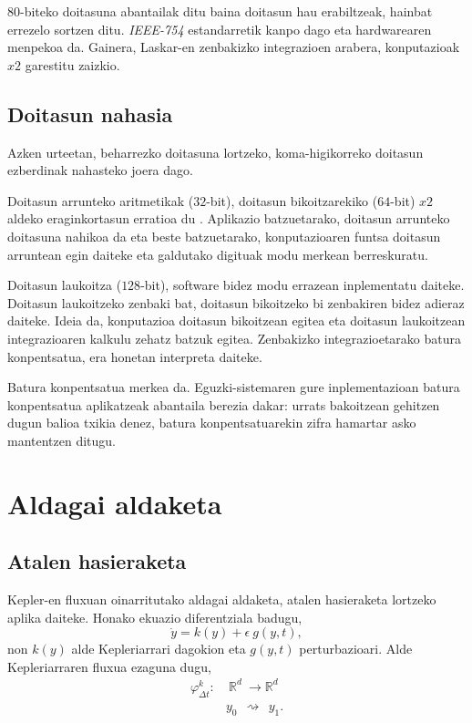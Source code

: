 $80$-biteko doitasuna abantailak ditu baina doitasun hau erabiltzeak, hainbat errezelo sortzen ditu. 
 \emph{IEEE-754} estandarretik kanpo dago eta hardwarearen menpekoa da. Gainera, Laskar-en \cite{Laskar2011} zenbakizko integrazioen arabera, konputazioak $x2$ garestitu zaizkio. 


\subsection*{Doitasun nahasia}


Azken urteetan, beharrezko doitasuna lortzeko, koma-higikorreko doitasun ezberdinak nahasteko joera dago. 

Doitasun arrunteko aritmetikak ($32$-bit), doitasun bikoitzarekiko ($64$-bit) $x2$ aldeko eraginkortasun erratioa  du \cite{Dongarra2017}. Aplikazio batzuetarako, doitasun arrunteko doitasuna nahikoa da eta beste batzuetarako, konputazioaren funtsa doitasun arruntean egin daiteke eta galdutako digituak modu merkean berreskuratu.

Doitasun laukoitza ($128$-bit), software bidez modu errazean  inplementatu daiteke. Doitasun laukoitzeko zenbaki bat, doitasun bikoitzeko bi zenbakiren bidez adieraz daiteke. Ideia da, konputazioa doitasun bikoitzean egitea eta doitasun laukoitzean integrazioaren kalkulu zehatz batzuk egitea. Zenbakizko integrazioetarako batura konpentsatua, era honetan interpreta daiteke. 

Batura konpentsatua merkea da. Eguzki-sistemaren gure inplementazioan batura konpentsatua aplikatzeak abantaila berezia dakar: urrats bakoitzean gehitzen dugun balioa txikia denez, batura konpentsatuarekin zifra hamartar asko mantentzen ditugu.            


\section{Aldagai aldaketa}


\subsection*{Atalen hasieraketa}
Kepler-en fluxuan oinarritutako aldagai aldaketa, atalen hasieraketa lortzeko aplika daiteke. Honako ekuazio diferentziala badugu,
\begin{equation*}
\dot{y}=k(y)+\epsilon \ g(y,t),
\end{equation*}
non $k(y)$ alde Kepleriarrari dagokion eta $g(y,t)$ perturbazioari. Alde Kepleriarraren fluxua ezaguna dugu,
\begin{align*}
\varphi_{\Delta t}^k:&  \ \mathbb{R}^d \ \longrightarrow \mathbb{R}^d  \\
&  y_0 \ \ \rightsquigarrow \ \ y_1. 
\end{align*}

